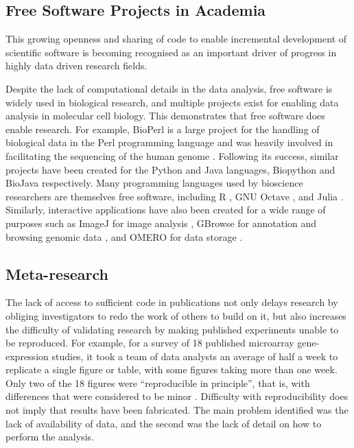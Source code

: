   \subsection{Free Software Projects in Academia}
  This growing openness and sharing of code to enable incremental
  development of scientific software is becoming recognised as an
  important driver of progress in highly data driven research fields.

  Despite the lack of computational details in the data analysis,
  free software is widely used in biological research,
  and multiple projects exist
  for enabling data analysis in molecular cell biology.
  This demonstrates that free software does enable research.
  For example, BioPerl is a large project for the handling of biological
  data in the Perl programming language and was heavily involved in
  facilitating the sequencing of the human genome \citep{bioperl}.
  Following its success, similar projects have been
  created for the Python and Java languages,
  Biopython \citep{biopython} and BioJava \citep{biojava}
  respectively.
  Many programming languages used by bioscience researchers are themselves
  free software, including R \citep{R-manual}, GNU
  Octave \citep{octave}, and Julia \citep{julia}.
  Similarly, interactive applications have also been
  created for a wide range of purposes such as
  ImageJ for image analysis \citep{imagej1}, GBrowse for
  annotation and browsing genomic data \citep{gbrowse},
  and OMERO for data storage \citep{omero}.

  \subsection{Meta-research}

  The lack of access to sufficient code in
  publications not only delays research by
  obliging investigators to redo the work of others to build on it, but also
  increases the difficulty of validating research
  by making published experiments unable to be reproduced.
  For example, for a survey of 18 published microarray gene-expression
  studies, it took a team of data analysts an average of half a week
  to replicate a single figure or table, with some figures taking more
  than one week.  Only two of the 18 figures were ``reproducible in
  principle'', that is, with differences that were considered to be minor
  \citep{ioannidis2009repeatability}.
  Difficulty with reproducibility
  does not imply that results have been fabricated.
  The main problem identified was the lack of availability
  of data, and the second was the lack of detail on how to perform the
  analysis.

